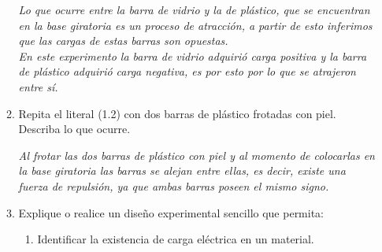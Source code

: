 \begin{enumerate}
\begin{enumerate}
        \textit{
            Lo que ocurre entre la barra de vidrio y la de plástico, que se
            encuentran en la base giratoria es un proceso de atracción, a partir
            de esto inferimos que las cargas de estas barras son opuestas.\\
            
            En este experimento la barra de vidrio adquirió carga positiva y la
            barra de plástico adquirió carga negativa, es por esto por lo que se
            atrajeron entre sí. 
        }

        \item Repita el literal (1.2) con dos barras de plástico frotadas con
        piel. Describa lo que ocurre.

        \textit{
            Al frotar las dos barras de plástico con piel y al momento de
            colocarlas en la base giratoria las barras se alejan entre ellas, es
            decir, existe una fuerza de repulsión, ya que ambas barras poseen el
            mismo signo.
        }
        
        \item Explique o realice un diseño experimental sencillo que permita:
        \begin{enumerate}
            \item Identificar la existencia de carga eléctrica en un material.\\
            

\end{enumerate}
\end{enumerate}
\end{enumerate}
